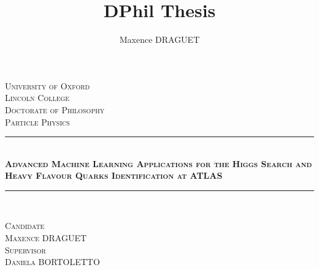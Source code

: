 \documentclass[11pt,a4paper]{report}
\author{Maxence DRAGUET}
\title{DPhil Thesis}
\begin{document}
\begin{titlepage}
\pagecolor{oxfordblue}    

\newcommand{\HRule}{\rule{\linewidth}{0.5mm}}
\center 
\vspace*{2cm}
\textsc{\LARGE \color{white} University of Oxford}\\[0.5cm] 
\textsc{\large \color{white} Lincoln College}\\[1cm]
\textsc{\Large \color{white} Doctorate of Philosophy}\\[0.3cm]
\textsc{\large \color{white} Particle Physics}\\[2cm]

{\color{white} \HRule} \\[0.4cm]
\textsc{\huge \bfseries \color{white} Advanced Machine Learning Applications for the Higgs Search and Heavy Flavour Quarks Identification at ATLAS}\\[0.4cm] 
{\color{white} \HRule}\\[1.5cm]
\color{white}
    \begin{minipage}{0.4\textwidth}
    \begin{center}
    \textsc{Candidate\\[0.2cm]
    \Large Maxence DRAGUET}\\[0.3cm]
    \textsc{Supervisor\\[0.2cm]
    \Large Daniela BORTOLETTO}\\
		
    \end{center}
    \end{minipage}


\end{titlepage}
\end{document}
